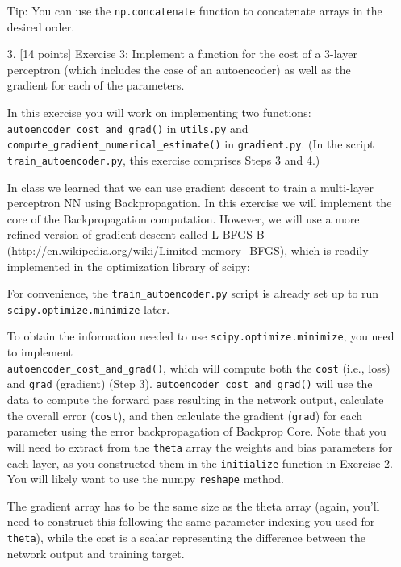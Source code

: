 \documentclass[10pt]{article}
\begin{document}
\begin{itemize}
Tip: You can use the {\tt np.concatenate} function to concatenate arrays in the desired order.  



\item[3.] [14 points]
Exercise 3:  
Implement a function for the cost of a 3-layer perceptron (which includes the case of an autoencoder) as well as the gradient for each of the parameters.
  
In this exercise you will work on implementing two functions: {\tt autoencoder\_cost\_and\_grad()} in {\tt utils.py} and {\tt compute\_gradient\_numerical\_estimate()} in {\tt gradient.py}.  (In the script\\ {\tt train\_autoencoder.py}, this exercise comprises Steps 3 and 4.)

In class we learned that we can use gradient descent to train a multi-layer perceptron NN using Backpropagation.  In this exercise we will implement the core of the Backpropagation computation.  However, we will use a more refined version of gradient descent called L-BFGS-B (\url{http://en.wikipedia.org/wiki/Limited-memory_BFGS}), which is readily implemented in the optimization library of scipy:

\hspace{2cm}{\tt scipy.optimize.minimize(..., method='L-BFGS-B', ...)}

For convenience, the {\tt train\_autoencoder.py} script is already set up to run \\ {\tt scipy.optimize.minimize} later.  

To obtain the information needed to use {\tt scipy.optimize.minimize}, you need to implement \\ {\tt autoencoder\_cost\_and\_grad()}, which will compute both the {\tt cost} (i.e., loss) and {\tt grad} (gradient) (Step 3).  {\tt autoencoder\_cost\_and\_grad()} will use the data to compute the forward pass resulting in the network output, calculate the overall error ({\tt cost}), and then calculate the gradient ({\tt grad}) for each parameter using the error backpropagation of Backprop Core.  Note that you will need to extract from the {\tt theta} array the weights and bias parameters for each layer, as you constructed them in the {\tt initialize} function in Exercise 2.  You will likely want to use the numpy {\tt reshape} method.

The gradient array has to be the same size as the theta array (again, you'll need to construct this following the same parameter indexing you used for {\tt theta}), while the cost is a scalar representing the difference between the network output and training target.


\end{itemize}
\end{document}
